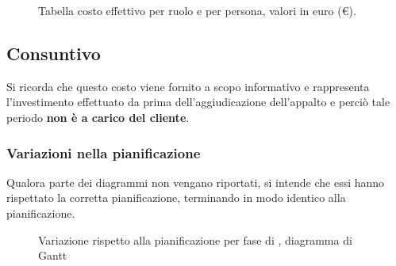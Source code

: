 \begin{figure}[H]
\label{tab:car}
\caption{Tabella costo effettivo {\AR} per ruolo e per persona, valori in euro (\euro).}
\end{figure}
\subsection{Consuntivo \ARI}
\introconsuntivo{\ARI}

Si ricorda che questo costo viene fornito a scopo informativo e rappresenta l'investimento effettuato da {\hx} prima dell'aggiudicazione dell'appalto e perciò tale periodo \textbf{non è a carico del cliente}. 

\subsubsection{Variazioni nella pianificazione}

Qualora parte dei diagrammi non vengano riportati, si intende che essi hanno rispettato la corretta pianificazione, terminando in modo identico alla pianificazione.

\begin{figure}[H]
\label{tab:cgen1}

  \caption{Variazione rispetto alla pianificazione per fase di \AR, diagramma di Gantt}
\end{figure}

